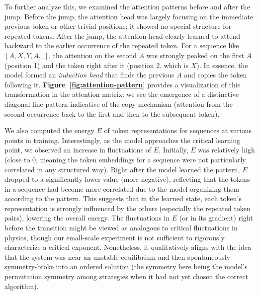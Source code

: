 \documentclass[12pt]{article}
\begin{document}
To further analyze this, we examined the attention patterns before and after the jump. Before the jump, the attention head was largely focusing on the immediate previous token or other trivial positions; it showed no special structure for repeated tokens. After the jump, the attention head clearly learned to attend backward to the earlier occurrence of the repeated token. For a sequence like $[A, X, Y, A, \_]$, the attention on the second $A$ was strongly peaked on the first $A$ (position 1) and the token right after it (position 2, which is $X$). In essence, the model formed an \emph{induction head} that finds the previous $A$ and copies the token following it. \textbf{Figure~\ref{fig:attention-pattern}} provides a visualization of this transformation in the attention matrix: we see the emergence of a distinctive diagonal-line pattern indicative of the copy mechanism (attention from the second occurrence back to the first and then to the subsequent token).


We also computed the energy $E$ of token representations for sequences at various points in training. Interestingly, as the model approaches the critical learning point, we observed an increase in fluctuations of $E$. Initially, $E$ was relatively high (close to 0, meaning the token embeddings for a sequence were not particularly correlated in any structured way). Right after the model learned the pattern, $E$ dropped to a significantly lower value (more negative), reflecting that the tokens in a sequence had become more correlated due to the model organizing them according to the pattern. This suggests that in the learned state, each token’s representation is strongly influenced by the others (especially the repeated token pairs), lowering the overall energy. The fluctuations in $E$ (or in its gradient) right before the transition might be viewed as analogous to critical fluctuations in physics, though our small-scale experiment is not sufficient to rigorously characterize a critical exponent. Nonetheless, it qualitatively aligns with the idea that the system was near an unstable equilibrium and then spontaneously symmetry-broke into an ordered solution (the symmetry here being the model’s permutation symmetry among strategies when it had not yet chosen the correct algorithm).
\end{document}
